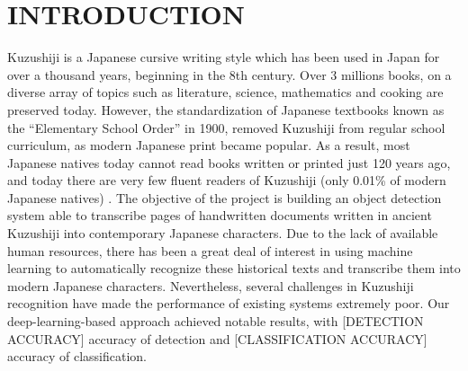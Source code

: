 \section{INTRODUCTION}
\label{sec:intro}

Kuzushiji is a Japanese cursive writing style which has been used in Japan for over a thousand years, beginning in the 8th century. Over 3 millions books, on a diverse array of topics such as literature, science, mathematics and cooking are preserved today. However, the standardization of Japanese textbooks known as the “Elementary School Order” in 1900, removed Kuzushiji from regular school curriculum, as modern Japanese print became popular. As a result, most Japanese natives today cannot read books written or printed just 120 years ago, and today there are very few fluent readers of Kuzushiji (only 0.01\% of modern Japanese natives) \cite{aboutkuz}. The objective of the project is building an object detection system able to transcribe pages of handwritten documents written in ancient Kuzushiji into contemporary Japanese characters. Due to the lack of available human resources, there has been a great deal of interest in using machine learning to automatically recognize these historical texts and transcribe them into modern Japanese characters. Nevertheless, several challenges in Kuzushiji recognition have made the performance of existing systems extremely poor. Our deep-learning-based approach achieved notable results, with [DETECTION ACCURACY] accuracy of detection and [CLASSIFICATION ACCURACY] accuracy of classification.
